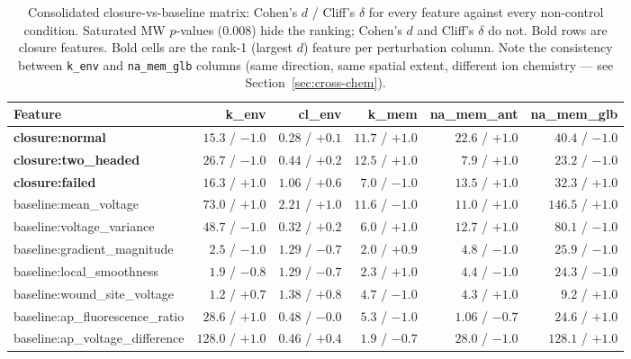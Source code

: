 \documentclass[11pt,a4paper]{article}
\begin{document}
\begin{table}[h]\centering\scriptsize
\caption{Consolidated closure-vs-baseline matrix: Cohen's $d$ / Cliff's $\delta$ for every feature against every non-control condition. Saturated MW $p$-values ($0.008$) hide the ranking; Cohen's $d$ and Cliff's $\delta$ do not. Bold rows are closure features. Bold cells are the rank-1 (largest $d$) feature per perturbation column. Note the consistency between \texttt{k\_env} and \texttt{na\_mem\_glb} columns (same direction, same spatial extent, different ion chemistry --- see Section~\ref{sec:cross-chem}).}\label{tab:baselines-matrix}
\begin{tabular}{lrrrrr}\toprule
Feature & k\_env & cl\_env & k\_mem & na\_mem\_ant & na\_mem\_glb \\
\midrule
\textbf{closure:normal}            & $15.3$ / $-1.0$ & $0.28$ / $+0.1$ & $11.7$ / $+1.0$ & $\mathbf{22.6}$ / $\mathbf{+1.0}$ & $40.4$ / $-1.0$ \\
\textbf{closure:two\_headed}       & $26.7$ / $-1.0$ & $0.44$ / $+0.2$ & $\mathbf{12.5}$ / $\mathbf{+1.0}$ & $7.9$ / $+1.0$ & $23.2$ / $-1.0$ \\
\textbf{closure:failed}            & $16.3$ / $+1.0$ & $1.06$ / $+0.6$ & $7.0$ / $-1.0$ & $13.5$ / $+1.0$ & $32.3$ / $+1.0$ \\
\midrule
baseline:mean\_voltage             & $73.0$ / $+1.0$ & $2.21$ / $+1.0$ & $11.6$ / $-1.0$ & $11.0$ / $+1.0$ & $\mathbf{146.5}$ / $\mathbf{+1.0}$ \\
baseline:voltage\_variance         & $48.7$ / $-1.0$ & $0.32$ / $+0.2$ & $6.0$ / $+1.0$ & $12.7$ / $+1.0$ & $80.1$ / $-1.0$ \\
baseline:gradient\_magnitude       & $2.5$ / $-1.0$ & $1.29$ / $-0.7$ & $2.0$ / $+0.9$ & $4.8$ / $-1.0$ & $25.9$ / $-1.0$ \\
baseline:local\_smoothness         & $1.9$ / $-0.8$ & $1.29$ / $-0.7$ & $2.3$ / $+1.0$ & $4.4$ / $-1.0$ & $24.3$ / $-1.0$ \\
baseline:wound\_site\_voltage      & $1.2$ / $+0.7$ & $1.38$ / $+0.8$ & $4.7$ / $-1.0$ & $4.3$ / $+1.0$ & $9.2$ / $+1.0$ \\
baseline:ap\_fluorescence\_ratio   & $28.6$ / $+1.0$ & $0.48$ / $-0.0$ & $5.3$ / $-1.0$ & $1.06$ / $-0.7$ & $24.6$ / $+1.0$ \\
baseline:ap\_voltage\_difference   & $\mathbf{128.0}$ / $\mathbf{+1.0}$ & $0.46$ / $+0.4$ & $1.9$ / $-0.7$ & $\mathbf{28.0}$ / $\mathbf{-1.0}$ & $128.1$ / $+1.0$ \\
\bottomrule\end{tabular}
\end{table}
\end{document}

